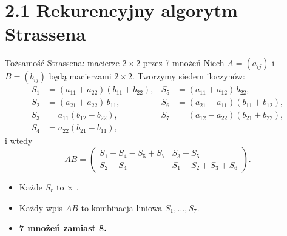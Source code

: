\section{2.1 Rekurencyjny algorytm Strassena}

\begin{frame}{Tożsamość Strassena: macierze $2\times2$ przez 7 mnożeń}
  Niech $A=(a_{ij})$ i $B=(b_{ij})$ będą macierzami $2\times2$. Tworzymy siedem iloczynów:
  \begin{equation*}
    \begin{aligned}
      S_1&=(a_{11}+a_{22})(b_{11}+b_{22}), & S_5&=(a_{11}+a_{12})\,b_{22},\\
      S_2&=(a_{21}+a_{22})\,b_{11},        & S_6&=(a_{21}-a_{11})(b_{11}+b_{12}),\\
      S_3&=a_{11}(b_{12}-b_{22}),          & S_7&=(a_{12}-a_{22})(b_{21}+b_{22}),\\
      S_4&=a_{22}(b_{21}-b_{11}),
    \end{aligned}\tag{1}
  \end{equation*}
  \pause
  i wtedy
  \[
    AB=\begin{pmatrix} S_1+S_4-S_5+S_7 & S_3+S_5\\ S_2+S_4 & S_1-S_2+S_3+S_6\end{pmatrix}.
  \]
  \pause
  \begin{itemize}
    \item Każde $S_r$ to  $\times$ .
    \item Każdy wpis $AB$ to kombinacja liniowa $S_1,\dots,S_7$.
    \item \textbf{7 mnożeń zamiast 8.}
  \end{itemize}
\end{frame}

